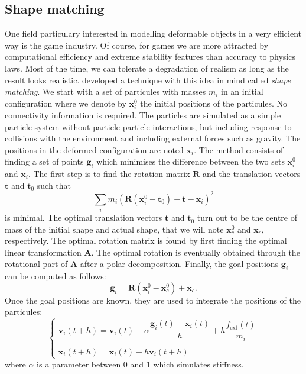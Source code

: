 	\subsection{Shape matching}
One field particulary interested in modelling deformable objects in a very efficient way is the game industry. Of course, for games we are more attracted by computational efficiency and extreme stability features than accuracy to physics laws. Most of the time, we can tolerate a degradation of realism as long as the result looks realistic. \cite{Muller05} developed a technique with this idea in mind called \emph{shape matching}. We start with a set of particules with masses $ m_i $ in an initial configuration where we denote by $ \mathbf{x}_i^0 $ the initial positions of the particules. No connectivity information is required. The particles are simulated as a simple particle system without particle-particle interactions, but including response to collisions with the environment and including external forces such as gravity. The positions in the deformed configuration are noted $ \mathbf{x}_i $. The method consists of finding a set of points $ \mathbf{g}_i $ which minimises the difference between the two sets $ \mathbf{x}_i^0 $ and $ \mathbf{x}_i $. The first step is to find the rotation matrix $ \mathbf{R} $ and the translation vectors $ \mathbf{t} $ and $ \mathbf{t}_0 $ such that
\begin{equation}
\sum_i m_i (\mathbf{R}(\mathbf{x}_i^0 - \mathbf{t}_0) + \mathbf{t} - \mathbf{x}_i)^2
\end{equation}
is minimal. The optimal translation vectors $ \mathbf{t} $ and $ \mathbf{t}_0 $ turn out to be the centre of mass of the initial shape and actual shape, that we will note $ \mathbf{x}_{c}^0 $ and $ \mathbf{x}_c $, respectively. The optimal rotation matrix is found by first finding the optimal linear transformation $ \mathbf{A} $. The optimal rotation is eventually obtained through the rotational part of $ \mathbf{A} $ after a polar decomposition. Finally, the goal positions $ \mathbf{g}_i $ can be computed as follows:
\begin{equation}
\mathbf{g}_i = \mathbf{R}(\mathbf{x}_i^0 - \mathbf{x}_{c}^0) + \mathbf{x}_{c}.
\end{equation}
Once the goal positions are known, they are used to integrate the positions of the particules:
\begin{equation}  
	\begin{cases} 
		\mathbf{v}_i(t+h) = \mathbf{v}_i(t) + \alpha \dfrac{\mathbf{g}_i(t) - \mathbf{x}_i(t)}{h}  + h \dfrac{f_{\text{ext}}(t)}{m_i} \\\\
		\mathbf{x}_i(t+h) = \mathbf{x}_i(t) + h \mathbf{v}_i(t+h)
	\end{cases}
\end{equation}
where $ \alpha $ is a parameter between $ 0 $ and $ 1 $ which simulates stiffness. 

